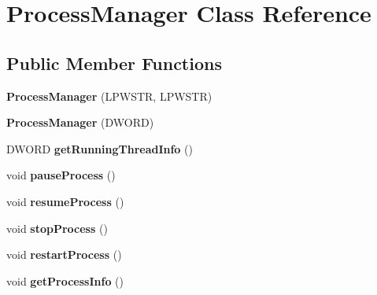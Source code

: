 \hypertarget{class_process_manager}{\section{Process\+Manager Class Reference}
\label{class_process_manager}
}
\subsection*{Public Member Functions}
\begin{DoxyCompactItemize}
\item 
\hypertarget{class_process_manager_aeb235e3509127e76fbc1f9c525603120}{{\bfseries Process\+Manager} (L\+P\+W\+S\+T\+R, L\+P\+W\+S\+T\+R)}\label{class_process_manager_aeb235e3509127e76fbc1f9c525603120}

\item 
\hypertarget{class_process_manager_a37ddbc730a38922c9b7a0dafb0b7ab55}{{\bfseries Process\+Manager} (D\+W\+O\+R\+D)}\label{class_process_manager_a37ddbc730a38922c9b7a0dafb0b7ab55}

\item 
\hypertarget{class_process_manager_a0ad5c900976a56f7b2ebc0c12f52cbaf}{D\+W\+O\+R\+D {\bfseries get\+Running\+Thread\+Info} ()}\label{class_process_manager_a0ad5c900976a56f7b2ebc0c12f52cbaf}

\item 
\hypertarget{class_process_manager_ab76d213c40e638d7f9010514c55b297c}{void {\bfseries pause\+Process} ()}\label{class_process_manager_ab76d213c40e638d7f9010514c55b297c}

\item 
\hypertarget{class_process_manager_a619fc4c91ff976a32ddd2ac4df145cd1}{void {\bfseries resume\+Process} ()}\label{class_process_manager_a619fc4c91ff976a32ddd2ac4df145cd1}

\item 
\hypertarget{class_process_manager_a3b451bc1c673b5439c9aae679a6d98f9}{void {\bfseries stop\+Process} ()}\label{class_process_manager_a3b451bc1c673b5439c9aae679a6d98f9}

\item 
\hypertarget{class_process_manager_a1d2886645115a6ead83e19caf0e5ea1f}{void {\bfseries restart\+Process} ()}\label{class_process_manager_a1d2886645115a6ead83e19caf0e5ea1f}

\item 
\hypertarget{class_process_manager_a44dcace533e34ae32b1b87f869027b69}{void {\bfseries get\+Process\+Info} ()}\label{class_process_manager_a44dcace533e34ae32b1b87f869027b69}


\end{DoxyCompactItemize}
